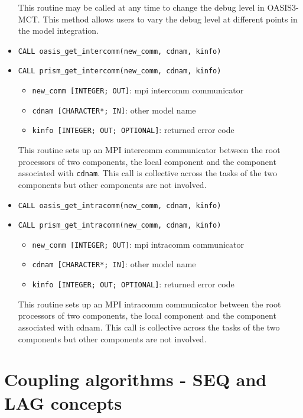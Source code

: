 \begin{itemize}
  This routine may be called at any time to change the debug level in
  OASIS3-MCT.  This method allows users to vary the debug level at
  different points in the model integration.

  \vspace{0.2cm}
\item {\tt CALL oasis\_get\_intercomm(new\_comm, cdnam, kinfo)}
\item {\tt CALL prism\_get\_intercomm(new\_comm, cdnam, kinfo)}
  \begin{itemize}
  \item {\tt new\_comm [INTEGER; OUT]}: mpi intercomm communicator
  \item {\tt cdnam [CHARACTER*; IN]}: other model name
  \item {\tt kinfo [INTEGER; OUT; OPTIONAL]}: returned error code
  \end{itemize}

  This routine sets up an MPI intercomm communicator between the root
  processors of two components, the local component and the component
  associated with {\tt cdnam}.  This call is collective across the
  tasks of the two components but other components are not involved.

  \vspace{0.2cm}
\item {\tt CALL oasis\_get\_intracomm(new\_comm, cdnam, kinfo)}
\item {\tt CALL prism\_get\_intracomm(new\_comm, cdnam, kinfo)}
  \begin{itemize}
  \item {\tt new\_comm [INTEGER; OUT]}: mpi intracomm communicator
  \item {\tt cdnam [CHARACTER*; IN]}: other model name
  \item {\tt kinfo [INTEGER; OUT; OPTIONAL]}: returned error code
  \end{itemize}

  This routine sets up an MPI intracomm communicator between the root
  processors of two components, the local component and the component
  associated with cdnam.  This call is collective across the tasks of
  the two components but other components are not involved.
\end{itemize}

\section{Coupling algorithms - SEQ and LAG concepts}
\label{subsubsec_Algoritms}

